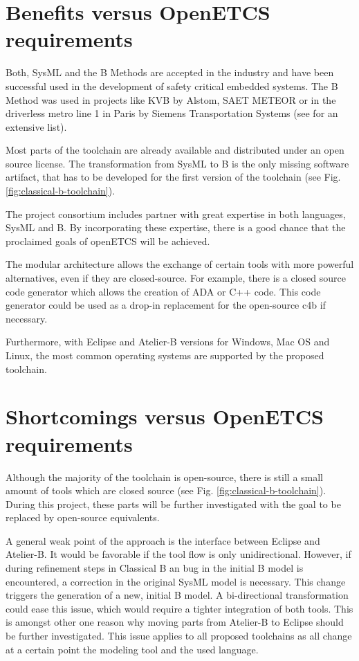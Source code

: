 \section{Benefits versus OpenETCS requirements}

Both, SysML and the B Methods are accepted in the industry and have
been successful used in the development of safety critical embedded
systems. The B Method was used in projects like KVB by Alstom, SAET
METEOR or in the driverless metro line 1 in Paris by Siemens
Transportation Systems (see \citep{clearsy} for an extensive list).

Most parts of the toolchain are already available and distributed
under an open source license. The transformation from SysML to B is
the only missing software artifact, that has to be developed for the
first version of the toolchain (see
Fig. \ref{fig:classical-b-toolchain}).

The project consortium includes partner with great expertise in both
languages, SysML and B. By incorporating these expertise, there is a
good chance that the proclaimed goals of openETCS will be achieved.

The modular architecture allows the exchange of certain tools with
more powerful alternatives, even if they are closed-source. For
example, there is a closed source code generator which allows the
creation of ADA or C++ code. This code generator could be used as a
drop-in replacement for the open-source c4b if necessary.

Furthermore, with Eclipse and Atelier-B versions for Windows, Mac OS
and Linux, the most common operating systems are supported by the
proposed toolchain.

\section{Shortcomings versus OpenETCS requirements}

Although the majority of the toolchain is open-source, there is still
a small amount of tools which are closed source (see
Fig. \ref{fig:classical-b-toolchain}). During this project, these
parts will be further investigated with the goal to be replaced by
open-source equivalents.

A general weak point of the approach is the interface between Eclipse
and Atelier-B. It would be favorable if the tool flow is only
unidirectional. However, if during refinement steps in Classical B an
bug in the initial B model is encountered, a correction in the
original SysML model is necessary. This change triggers the generation
of a new, initial B model. A bi-directional transformation could ease
this issue, which would require a tighter integration of both
tools. This is amongst other one reason why moving parts from
Atelier-B to Eclipse should be further investigated. This issue
applies to all proposed toolchains as all change at a certain point
the modeling tool and the used language.


